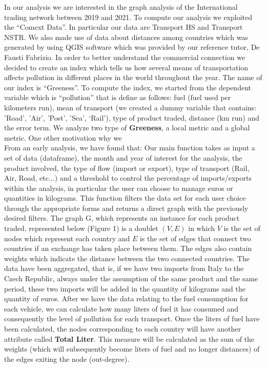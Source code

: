 \documentclass[a4paper,12pt]{article} %
\begin{document}
In our analysis we are interested in the graph analysis of the International trading network between 2019 and 2021. 
To compute our analysis we exploited the “Comext Data”. In particular our data are Transport HS and Transport NSTR.
We also made use of data about distances among countries which was generated by using QGIS software which was provided by our reference tutor, De Fausti Fabrizio. 
In order to better understand the commercial connection we decided to create an index which tells us how several means of transportation affects pollution in different places in the world throughout the year. The name of our index is “Greeness”. To compute the index, we started from the dependent variable which is “pollution” that is define as follows: fuel (fuel used per kilometers run), mean of transport (we created a dummy variable that contains: 'Road', 'Air', 'Post', 'Sea', ‘Rail’), type of product traded, distance  (km run) and the error term. 
We analyze two type of \textbf{Greeness}, a local metric and a global metric.
One other motivation why we \\

From an early analysis, we have found that: 
\newpage
Our main function takes as input a set of data (dataframe), the month and year of interest for the analysis, the product involved, the type of flow (import or export), type of transport (Rail, Air, Road, etc...) and a threshold to control the percentage of imports/exports within the analysis, in particular the user can choose to manage euros or quantities in kilograms. This function filters the data set for each user choice through the appropriate forms and returns a direct graph with the previously desired filters. The graph G, which represents an instance for each product traded, represented below (Figure 1) is a doublet $(V, E)$ in which $V$ is the set of nodes which represent each country and $E$ is the set of edges that connect two countries if an exchange has taken place between them. The edges also contain weights which indicate the distance between the two connected countries. The data have been aggregated, that is, if we have two imports from Italy to the Czech Republic, always under the assumption of the same product and the same period, these two imports will be added in the quantity of kilograms and the quantity of euros. After we have the data relating to the fuel consumption for each vehicle, we can calculate how many liters of fuel it has consumed and consequently the level of pollution for each transport. Once the liters of fuel have been calculated, the nodes corresponding to each country will have another attribute called \textbf{Total Liter}. This measure will be calculated as the sum of the weights (which will subsequently become liters of fuel and no longer distances) of the edges exiting the node (out-degree).\\
\end{document}
